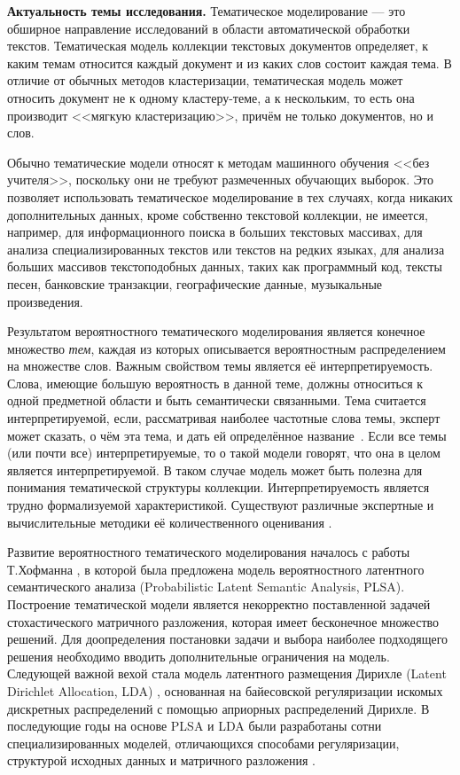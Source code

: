  
\textbf{Актуальность темы исследования.}  
Тематическое моделирование --- это обширное направление исследований в области автоматической обработки текстов. Тематическая модель коллекции текстовых документов определяет, к каким темам относится каждый документ и из каких слов состоит каждая тема. В отличие от обычных методов кластеризации, тематическая модель может относить документ не к одному кластеру-теме, а к нескольким, то есть  она производит <<мягкую кластеризацию>>, причём не только документов, но и слов.  

Обычно тематические модели относят к методам машинного обучения <<без учителя>>, поскольку они не требуют размеченных обучающих выборок. Это позволяет использовать тематическое моделирование в тех случаях, когда никаких дополнительных данных, кроме собственно текстовой коллекции, не имеется, например, для информационного поиска в больших текстовых массивах, для анализа специализированных текстов или текстов на редких языках, для анализа больших массивов текстоподобных данных, таких как программный код, тексты песен, банковские транзакции, географические данные, музыкальные произведения. 

Результатом вероятностного тематического моделирования является конечное множество \textit{тем}, каждая из которых описывается вероятностным распределением на множестве слов. Важным свойством темы является её интерпретируемость. Слова, имеющие большую вероятность в данной теме, должны относиться к одной предметной области и быть семантически связанными. Тема считается интерпретируемой, если, рассматривая наиболее частотные слова темы, эксперт может сказать, о чём эта тема, и дать ей определённое название~\cite{rtl}. Если все темы (или почти все) интерпретируемые, то о такой модели говорят, что она в целом является интерпретируемой. В таком случае модель может быть полезна для понимания тематической структуры коллекции. Интерпретируемость является трудно формализуемой характеристикой. Существуют различные экспертные и вычислительные методики её количественного оценивания \cite{newman2010automatic}.   

Развитие вероятностного тематического моделирования началось с работы Т.Хофманна \cite{hofmann1999}, в которой была предложена модель вероятностного латентного семантического анализа (Probabilistic Latent Semantic Analysis, PLSA). Построение тематической модели является некорректно поставленной задачей стохастического матричного разложения, которая имеет бесконечное множество решений. Для доопределения постановки задачи и выбора наиболее подходящего решения необходимо вводить дополнительные ограничения на модель. Следующей важной вехой стала модель латентного размещения Дирихле (Latent Dirichlet Allocation, LDA) \cite{blei2003latent}, основанная на байесовской регуляризации искомых дискретных распределений с помощью априорных распределений Дирихле. В последующие годы на основе PLSA и LDA были разработаны сотни специализированных моделей, отличающихся способами регуляризации, структурой исходных данных и матричного разложения \cite{daud10knowledge,blei2012,fntir2017applications}.  

